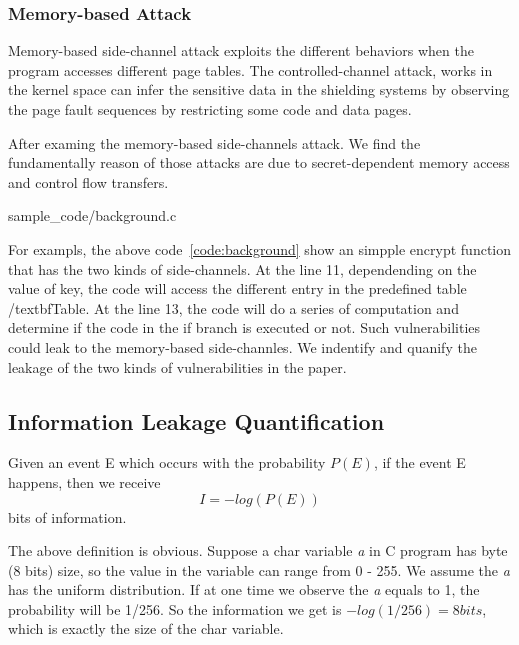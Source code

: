 \subsubsection{Memory-based Attack}
Memory-based side-channel attack\cite{} exploits the different behaviors when the
program accesses different page tables. The controlled-channel attack\cite{7163052},
works in the kernel space can infer the sensitive data in the shielding systems by
observing the page fault sequences by restricting some code and
data pages. 

After examing the memory-based side-channels attack. We find the fundamentally
reason of those attacks are due to secret-dependent memory access and control
flow transfers.

                 {sample_code/background.c}

For exampls, the above code~\ref{code:background} show an simpple encrypt function that
has the two kinds of side-channels. At the line 11, dependending on the value of key,
the code will access the different entry in the predefined table /textbf{Table}. At the
line 13, the code will do a series of computation and determine if the code in the if
branch is executed or not. Such vulnerabilities could leak to the memory-based 
side-channles. We indentify and quanify the leakage of the two kinds of vulnerabilities 
in the paper.

\subsection{Information Leakage Quantification}
Given an event E which occurs with the probability $P(E)$, if the event E happens, 
then we receive
\begin{equation}
    I = - log(P(E))
\end{equation}
bits of information.

The above definition is obvious. Suppose a char variable \textit{a} in C program has 
byte (8 bits) size, so the value in the variable can range from 0 - 255. We assume
the \textit{a} has the uniform distribution. If at one time we observe the \textit{a}
equals to 1, the probability will be 1/256. So the information we get is 
$-log(1/256) = 8 bits$, which is exactly the size of the char variable.

